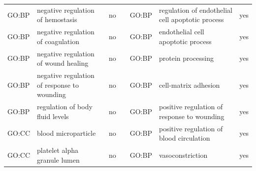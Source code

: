 \begin{longtable}{@{}lp{5cm}lllp{5cm}l@{}}
GO:BP           & negative regulation of hemostasis                                                                                                  & no               &           & GO:BP           & regulation of endothelial cell apoptotic process                                                                                                                       & yes              \\
GO:BP           & negative regulation of coagulation                                                                                                 & no               &           & GO:BP           & endothelial cell apoptotic process                                                                                                                                     & yes              \\
GO:BP           & negative regulation of wound healing                                                                                               & no               &           & GO:BP           & protein processing                                                                                                                                                     & yes              \\
GO:BP           & negative regulation of response to wounding                                                                                        & no               &           & GO:BP           & cell-matrix adhesion                                                                                                                                                   & yes              \\
GO:BP           & regulation of body fluid levels                                                                                                    & no               &           & GO:BP           & positive regulation of response to wounding                                                                                                                            & yes              \\
GO:CC           & blood microparticle                                                                                                                & no               &           & GO:BP           & positive regulation of blood circulation                                                                                                                               & yes              \\
GO:CC           & platelet alpha granule lumen                                                                                                       & no               &           & GO:BP           & vasoconstriction                                                                                                                                                       & yes              \\

\end{longtable}
